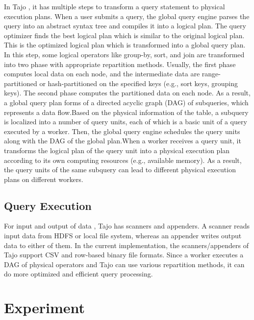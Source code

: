 \documentclass[9pt,twocolumn,twoside]{../../styles/osajnl}
\begin{document}
\noindent
In Tajo \cite{tajo-paper} \cite{www-apache-tajo}, it has multiple
steps to transform a query statement to physical execution plans. When
a user submits a query, the global query engine parses the query into
an abstract syntax tree and compiles it into a logical plan. The query
optimizer finds the best logical plan which is similar to the original
logical plan. This is the optimized logical plan which is transformed
into a global query plan. In this step, some logical operators like
group-by, sort, and join are transformed into two phase with
appropriate repartition methods. Usually, the first phase computes
local data on each node, and the intermediate data are
range-partitioned or hash-partitioned on the specified keys (e.g.,
sort keys, grouping keys). The second phase computes the partitioned
data on each node. As a result, a global query plan forms of a
directed acyclic graph (DAG) of subqueries, which represents a data
flow.Based on the physical information of the table, a subquery is
localized into a number of query units, each of which is a basic unit
of a query executed by a worker. Then, the global query engine
schedules the query units along with the DAG of the global
plan.\newline \newline When a worker receives a query unit, it
transforms the logical plan of the query unit into a physical
execution plan according to its own computing resources (e.g.,
available memory). As a result, the query units of the same subquery
can lead to different physical execution plans on different workers.

\subsection{Query Execution}
For input and output of data \cite{tajo-paper}, Tajo has scanners and
appenders. A scanner reads input data from HDFS or local file system,
whereas an appender writes output data to either of them. In the
current implementation, the scanners/appenders of Tajo support CSV and
row-based binary file formats. Since a worker executes a DAG of
physical operators and Tajo can use various repartition methods, it
can do more optimized and efficient query processing.

\section{Experiment}
\end{document}

